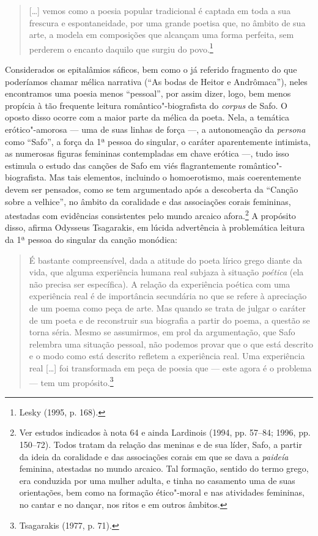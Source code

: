 \begin{quote}
\mbox[\ldots{}] vemos como a poesia popular
tradicional é captada em toda a sua frescura e espontaneidade, por uma grande
poetisa que, no âmbito de sua arte, a modela em composições que alcançam uma
forma perfeita, sem perderem o encanto daquilo que surgiu do povo.\footnote{ Lesky (1995, p. 168).}
\end{quote}

Considerados os epitalâmios sáficos, bem como o já referido fragmento do que
poderíamos chamar mélica narrativa (“As bodas de Heitor e Andrômaca”), neles
encontramos uma poesia menos “pessoal”, por assim dizer, logo, bem menos
propícia à tão frequente leitura romântico"-biografista do \textit{corpus} de
Safo. O oposto disso ocorre com a maior parte da mélica da poeta. Nela, a temática
erótico"-amorosa --- uma de suas linhas de força ---, a autonomeação da
\textit{persona} como “Safo”, a força da 1ª pessoa do singular, o caráter
aparentemente intimista, as numerosas figuras
femininas contempladas em chave erótica ---, tudo isso estimula o estudo das
canções de Safo em viés flagrantemente romântico"-biografista. Mas tais elementos, incluindo o homoerotismo, mais coerentemente devem ser pensados, como se tem argumentado após a descoberta da ``Canção sobre a velhice'', no âmbito da coralidade e das associações corais femininas, atestadas com evidências consistentes pelo mundo arcaico afora.\footnote{Ver estudos indicados à nota 64 e ainda Lardinois (1994, pp. 57--84; 1996, pp. 150--72). Todos tratam da relação das meninas e de sua líder, Safo, a partir da ideia da coralidade e das associações corais em que se dava a \textit{paideía} feminina, atestadas no mundo arcaico. Tal formação, sentido do termo grego, era conduzida por uma mulher adulta, e tinha no casamento uma de suas orientações, bem como na formação ético"-moral e nas atividades femininas, no cantar e no dançar, nos ritos e em outros âmbitos.} A propósito
disso, afirma Odysseus Tsagarakis, em lúcida advertência à
problemática leitura da 1ª pessoa do singular da canção
monódica:

\begin{quote}
É bastante compreensível, dada a atitude do poeta lírico grego diante da vida,
que alguma experiência humana real subjaza à situação \textit{poética} (ela não
precisa ser específica). A relação da experiência poética com uma experiência
real é de importância secundária no que se refere à apreciação de um poema como
peça de arte. Mas quando se trata de julgar o caráter de um poeta e de
reconstruir sua biografia a partir do poema, a questão se torna séria. Mesmo se
assumirmos, em prol da argumentação, que Safo relembra uma situação pessoal,
não podemos provar que o que está descrito e o modo como está descrito refletem
a experiência real. Uma experiência real [\ldots{}] foi transformada em peça de
poesia que --- este agora é o problema --- tem um propósito.\footnote{ Tsagarakis (1977, p. 71).}
\end{quote}

